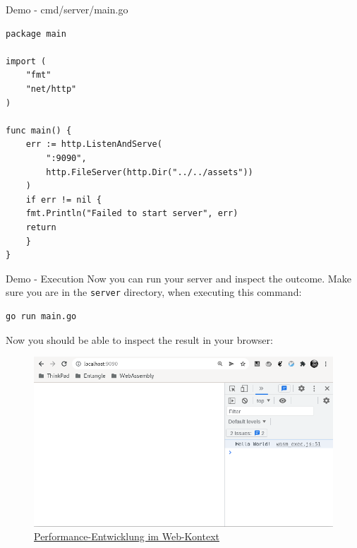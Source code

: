 \documentclass{beamer}
\begin{document}
\begin{frame}[fragile]{Demo - cmd/server/main.go}
    \begin{lstlisting}[language=html,basicstyle=\footnotesize]
package main

import (
	"fmt"
	"net/http"
)

func main() {
    err := http.ListenAndServe(
        ":9090", 
        http.FileServer(http.Dir("../../assets"))
    )
    if err != nil {
	fmt.Println("Failed to start server", err)
	return
    }
}

    \end{lstlisting}
\end{frame}

\begin{frame}[fragile]{Demo - Execution}
Now you can run your server and inspect the outcome. Make sure you are in the \lstinline{server} directory, when executing this command:
\begin{lstlisting}[language=bash,basicstyle=\footnotesize]
go run main.go
\end{lstlisting}

Now you should be able to inspect the result in your browser: 
\begin{figure}
    \includegraphics[scale=0.3]{./images/demo.png}
    \caption{\href{https://hacks.mozilla.org/2017/02/a-cartoon-intro-to-webassembly/}{Performance-Entwicklung im Web-Kontext}}
\end{figure}
\end{frame}
\end{document}
